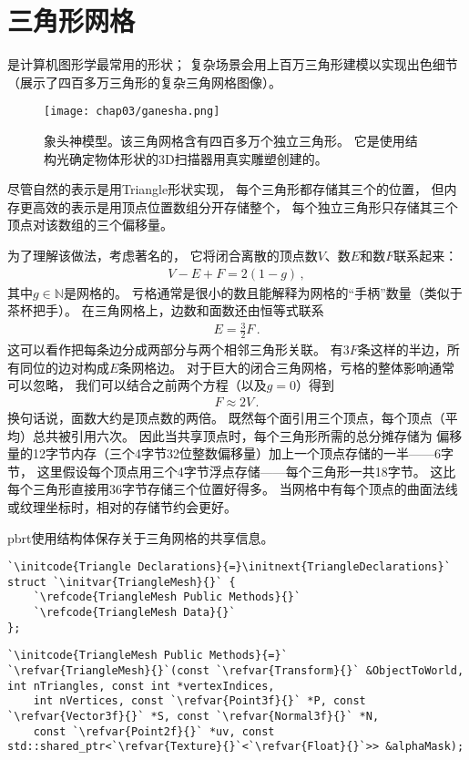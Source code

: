 \section{三角形网格}\label{sec:三角形网格}
是计算机图形学最常用的形状；
复杂场景会用上百万三角形建模以实现出色细节
（展示了四百多万三角形的复杂三角网格图像）。
\begin{figure}[htb]
    \centering\texttt{[image: chap03/ganesha.png]}
    \caption{象头神模型。该三角网格含有四百多万个独立三角形。
        它是使用结构光确定物体形状的3D扫描器用真实雕塑创建的。}
    \label{fig:3.11}
\end{figure}

尽管自然的表示是用{\ttfamily Triangle}形状实现，
每个三角形都存储其三个的位置，
但内存更高效的表示是用顶点位置数组分开存储整个，
每个独立三角形只存储其三个顶点对该数组的三个偏移量。

为了理解该做法，考虑著名的，
它将闭合离散的顶点数$V$、数$E$和数$F$联系起来：
\begin{align*}
    V-E+F=2(1-g)\, ,
\end{align*}
其中$g\in\mathbb{N}$是网格的。
亏格通常是很小的数且能解释为网格的“手柄”数量（类似于茶杯把手）。
在三角网格上，边数和面数还由恒等式联系
\begin{align*}
    E=\frac{3}{2}F\, .
\end{align*}
这可以看作把每条边分成两部分与两个相邻三角形关联。
有$3F$条这样的半边，所有同位的边对构成$E$条网格边。
对于巨大的闭合三角网格，亏格的整体影响通常可以忽略，
我们可以结合之前两个方程（以及$g=0$）得到
\begin{align*}
    F\approx2V\, .
\end{align*}
换句话说，面数大约是顶点数的两倍。
既然每个面引用三个顶点，每个顶点（平均）总共被引用六次。
因此当共享顶点时，每个三角形所需的总分摊存储为
偏移量的12字节内存（三个4字节32位整数偏移量）加上一个顶点存储的一半——6字节，
这里假设每个顶点用三个4字节浮点存储——每个三角形一共18字节。
这比每个三角形直接用36字节存储三个位置好得多。
当网格中有每个顶点的曲面法线或纹理坐标时，相对的存储节约会更好。

pbrt使用结构体保存关于三角网格的共享信息。
\begin{lstlisting}
`\initcode{Triangle Declarations}{=}\initnext{TriangleDeclarations}`
struct `\initvar{TriangleMesh}{}` {
    `\refcode{TriangleMesh Public Methods}{}`
    `\refcode{TriangleMesh Data}{}`
};
\end{lstlisting}
\begin{lstlisting}
`\initcode{TriangleMesh Public Methods}{=}`
`\refvar{TriangleMesh}{}`(const `\refvar{Transform}{}` &ObjectToWorld, int nTriangles, const int *vertexIndices,
    int nVertices, const `\refvar{Point3f}{}` *P, const `\refvar{Vector3f}{}` *S, const `\refvar{Normal3f}{}` *N,
    const `\refvar{Point2f}{}` *uv, const std::shared_ptr<`\refvar{Texture}{}`<`\refvar{Float}{}`>> &alphaMask);
\end{lstlisting}

